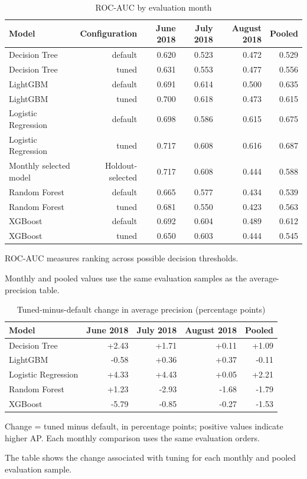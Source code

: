 \begin{table}[htbp]
\centering
\small
\caption{ROC-AUC by evaluation month}
\begin{tabular}{lrrrrr}
\toprule
Model & Configuration & June 2018 & July 2018 & August 2018 & Pooled \\
\midrule
Decision Tree & default & 0.620 & 0.523 & 0.472 & 0.529 \\
Decision Tree & tuned & 0.631 & 0.553 & 0.477 & 0.556 \\
LightGBM & default & 0.691 & 0.614 & 0.500 & 0.635 \\
LightGBM & tuned & 0.700 & 0.618 & 0.473 & 0.615 \\
Logistic Regression & default & 0.698 & 0.586 & 0.615 & 0.675 \\
Logistic Regression & tuned & 0.717 & 0.608 & 0.616 & 0.687 \\
Monthly selected model & Holdout-selected & 0.717 & 0.608 & 0.444 & 0.588 \\
Random Forest & default & 0.665 & 0.577 & 0.434 & 0.539 \\
Random Forest & tuned & 0.681 & 0.550 & 0.423 & 0.563 \\
XGBoost & default & 0.692 & 0.604 & 0.489 & 0.612 \\
XGBoost & tuned & 0.650 & 0.603 & 0.444 & 0.545 \\
\bottomrule
\end{tabular}
\par\smallskip\begin{minipage}{\linewidth}\footnotesize ROC-AUC measures ranking across possible decision thresholds.\end{minipage}
\end{table}
Monthly and pooled values use the same evaluation samples as the average-precision table.

\begin{table}[htbp]
\centering
\small
\caption{Tuned-minus-default change in average precision (percentage points)}
\begin{tabular}{lrrrr}
\toprule
Model & June 2018 & July 2018 & August 2018 & Pooled \\
\midrule
Decision Tree & +2.43 & +1.71 & +0.11 & +1.09 \\
LightGBM & -0.58 & +0.36 & +0.37 & -0.11 \\
Logistic Regression & +4.33 & +4.43 & +0.05 & +2.21 \\
Random Forest & +1.23 & -2.93 & -1.68 & -1.79 \\
XGBoost & -5.79 & -0.85 & -0.27 & -1.53 \\
\bottomrule
\end{tabular}
\par\smallskip\begin{minipage}{\linewidth}\footnotesize Change = tuned minus default, in percentage points; positive values indicate higher AP. Each monthly comparison uses the same evaluation orders.\end{minipage}
\end{table}
The table shows the change associated with tuning for each monthly and pooled evaluation sample.

